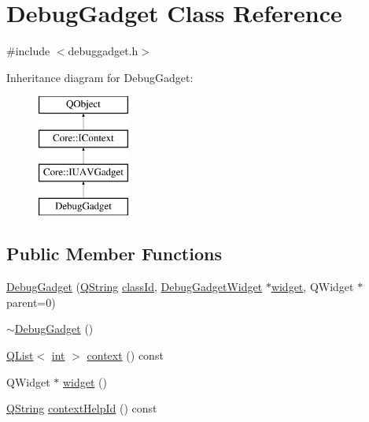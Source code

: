 \hypertarget{class_debug_gadget}{\section{Debug\-Gadget Class Reference}
\label{class_debug_gadget}
}


{\ttfamily \#include $<$debuggadget.\-h$>$}

Inheritance diagram for Debug\-Gadget\-:\begin{figure}[H]
\begin{center}
\leavevmode
\includegraphics[height=4.000000cm]{class_debug_gadget}
\end{center}
\end{figure}
\subsection*{Public Member Functions}
\begin{DoxyCompactItemize}
\item 
\hyperlink{group___debug_gadget_plugin_gae32cda168c382c01595bc348472e69f0}{Debug\-Gadget} (\hyperlink{group___u_a_v_objects_plugin_gab9d252f49c333c94a72f97ce3105a32d}{Q\-String} \hyperlink{group___core_plugin_ga3878fde66a57220608960bcc3fbeef2c}{class\-Id}, \hyperlink{class_debug_gadget_widget}{Debug\-Gadget\-Widget} $\ast$\hyperlink{group___debug_gadget_plugin_ga08f35a753d418ed6e9d9594bcce8fee8}{widget}, Q\-Widget $\ast$parent=0)
\item 
\hyperlink{group___debug_gadget_plugin_gab1dfec6b8b4cb29fa466e6102d3096ac}{$\sim$\-Debug\-Gadget} ()
\item 
\hyperlink{class_q_list}{Q\-List}$<$ \hyperlink{ioapi_8h_a787fa3cf048117ba7123753c1e74fcd6}{int} $>$ \hyperlink{group___debug_gadget_plugin_gaaf1624068acedd32979ab08deddefe6e}{context} () const 
\item 
Q\-Widget $\ast$ \hyperlink{group___debug_gadget_plugin_ga08f35a753d418ed6e9d9594bcce8fee8}{widget} ()
\item 
\hyperlink{group___u_a_v_objects_plugin_gab9d252f49c333c94a72f97ce3105a32d}{Q\-String} \hyperlink{group___debug_gadget_plugin_ga123c9f10792e9dcd8f128da2be20f176}{context\-Help\-Id} () const 
\end{DoxyCompactItemize}
